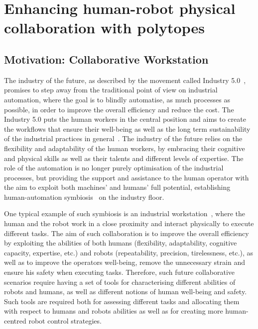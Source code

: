 
\chapter{Enhancing human-robot physical collaboration with polytopes}


\section{Motivation: Collaborative Workstation}
The industry of the future, as described by the movement called Industry 5.0~\cite{MADDIKUNTA2022ind50}, promises to step away from the traditional point of view on industrial automation, where the goal is to blindly automatise, as much processes as possible, in order to improve the overall efficiency and reduce the cost. The Industry 5.0 puts the human workers in the central position and aims to create the workflows that ensure their well-being as well as the long term sustainability of the industrial practices in general~\cite{XU2021ind50}. The industry of the future relies on the flexibility and adaptability of the human workers, by embracing their cognitive and physical skills as well as their talents and different levels of expertise. The role of the automation is no longer purely optimisation of the industrial processes, but providing the support and assistance to the human operator with the aim to exploit both machines' and humans' full potential, establishing human-automation symbiosis~\cite{LENG2022ind50} on the industry floor.
 
One typical example of such symbiosis is an industrial workstation~\cite{SIMOES2022workplace}, where the human and the robot work in a close proximity and interact physically to execute different tasks. The aim of such collaboration is to improve the overall efficiency by exploiting the abilities of both humans (flexibility, adaptability, cognitive capacity, expertise, etc.) and robots (repeatability, precision, tirelessness, etc.), as well as to improve the operators well-being, remove the unnecessary strain and ensure his safety when executing tasks. Therefore, such future collaborative scenarios require having a set of tools for characterising different abilities of robots and humans, as well as different notions of human well-being and safety. Such tools are required both for assessing different tasks and allocating them with respect to humans and robots abilities as well as for creating more human-centred robot control strategies.



